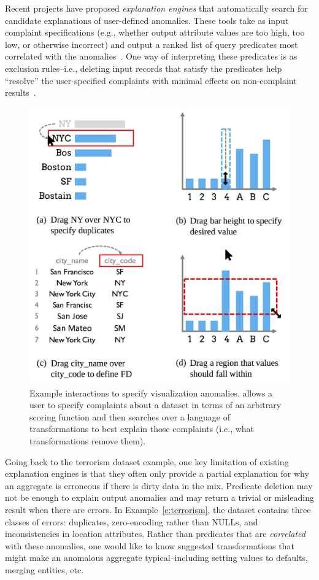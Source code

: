 Recent projects have proposed \emph{explanation engines} that automatically search for candidate explanations of user-defined anomalies.  These tools take as input complaint specifications (e.g., whether output attribute values are too high, too low, or otherwise incorrect) and output a ranked list of query predicates most correlated with the anomalies~\cite{scorpion,DBLP:conf/sigmod/ChalamallaIOP14,bailis2016macrobase,roy2015explaining}.  One way of interpreting these predicates is as exclusion rules--i.e., deleting input records that satisfy the predicates help ``resolve'' the user-specified complaints with minimal effects on non-complaint results~\cite{scorpion}.  

\begin{figure}[tb]
\centering
\includegraphics[width=.75\columnwidth]{figures/ui.png}
\vspace*{-.05in}
\caption{\small Example interactions to specify visualization anomalies. \sys allows a user to specify complaints about a dataset in terms of an arbitrary scoring function and then searches over a language of transformations to best explain those complaints (i.e., what transformations remove them).}
\label{f:ui}
\end{figure}

Going back to the terrorism dataset example, one key limitation of existing explanation engines is that they often only provide a partial explanation for why an aggregate is erroneous if there is dirty data in the mix. Predicate deletion may not be enough to explain output anomalies and may return a trivial or misleading result when there are errors. In Example~\ref{e:terrorism}, the dataset contains three classes of errors:  duplicates, zero-encoding rather than NULLs, and inconsistencies in location attributes. Rather than predicates that are \emph{correlated} with these anomalies, one would like to know suggested transformations that might make an anomalous aggregate typical--including setting values to defaults, merging entities, etc. 


